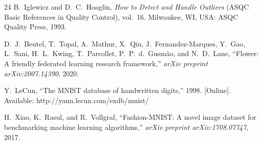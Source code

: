 \documentclass[journal]{IEEEtran}
\begin{document}
\begin{thebibliography}{24}
B.~Iglewicz and D.~C.~Hoaglin, \textit{How to Detect and Handle Outliers} (ASQC Basic References in Quality Control), vol.~16.\hskip 1sp Milwaukee, WI, USA: ASQC Quality Press, 1993.

D.~J.~Beutel, T.~Topal, A.~Mathur, X.~Qiu, J.~Fernandez-Marques, Y.~Gao, L.~Sani, H.~L.~Kwing, T.~Parcollet, P.~P.~d.~Gusm\~{a}o, and N.~D.~Lane, ``Flower: A friendly federated learning research framework,'' \textit{arXiv preprint arXiv:2007.14390}, 2020.

Y.~LeCun, ``The MNIST database of handwritten digits,'' 1998. [Online]. Available: http://yann.lecun.com/exdb/mnist/

H.~Xiao, K.~Rasul, and R.~Vollgraf, ``Fashion-MNIST: A novel image dataset for benchmarking machine learning algorithms,'' \textit{arXiv preprint arXiv:1708.07747}, 2017.

\end{thebibliography}
\end{document}
